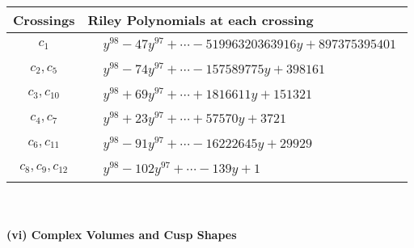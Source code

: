 \documentclass[1p]{elsarticle_modified}
\theoremstyle{definition}
\begin{document}
\begin{tabular}{m{50pt}|m{274pt}}
Crossings & \hspace{64pt}Riley Polynomials at each crossing \\
\hline $$\begin{aligned}c_{1}\end{aligned}$$&$\begin{aligned}
&y^{98}-47 y^{97}+\cdots-51996320363916 y+897375395401
\end{aligned}$\\
\hline $$\begin{aligned}c_{2},c_{5}\end{aligned}$$&$\begin{aligned}
&y^{98}-74 y^{97}+\cdots-157589775 y+398161
\end{aligned}$\\
\hline $$\begin{aligned}c_{3},c_{10}\end{aligned}$$&$\begin{aligned}
&y^{98}+69 y^{97}+\cdots+1816611 y+151321
\end{aligned}$\\
\hline $$\begin{aligned}c_{4},c_{7}\end{aligned}$$&$\begin{aligned}
&y^{98}+23 y^{97}+\cdots+57570 y+3721
\end{aligned}$\\
\hline $$\begin{aligned}c_{6},c_{11}\end{aligned}$$&$\begin{aligned}
&y^{98}-91 y^{97}+\cdots-16222645 y+29929
\end{aligned}$\\
\hline $$\begin{aligned}c_{8},c_{9},c_{12}\end{aligned}$$&$\begin{aligned}
&y^{98}-102 y^{97}+\cdots-139 y+1
\end{aligned}$\\
\hline
\end{tabular}\\~\\
\newpage\flushleft \textbf{(vi) Complex Volumes and Cusp Shapes}
\end{document}

